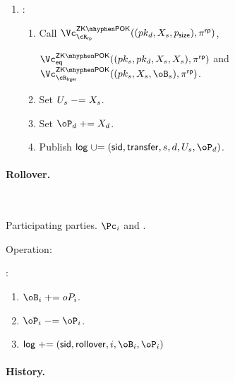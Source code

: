 \begin{protocol}
\begin{enumerate}
		
		\item  \Cc: 
		
		\begin{enumerate}
			\item  Call $\vZKPOK{\rRP}((pk_d,X_s,\psize),\pi^\RPs)$,
			
			 $\vZKPOK{\Eqs}((pk_s,pk_d,X_s,X_s),\pi^\RPs)$ and $\vZKPOK{\rLrg}((pk_s,X_s,\oB_s),\pi^\RPs)$.
			
		
		     \item  Set $U_s \mathrel{-}= X_s$. 
              
              \item  Set $\oP_d \pluseq X_d$. 
              
              		     
		     \item Publish  $\historylog \unioneq (\sid,\transfer,s,d,U_s,\oP_d)$.
		     
		\end{enumerate}
		
	\end{enumerate}
	
\end{protocol}



\paragraph{Rollover.}

\begin{protocol}~\label{prot:ConfidentialTransactions:Rollover}
	\item[Participating parties.] $\Pc_i$ and \Cc.
	
\item[Operation:] ~
	
	\Cc:
	
	\begin{enumerate}
	
	\item $\oB_i  \pluseq \\oP_i$.
	
	
	\item  $\oP_i \minuseq \oP_i$.
	
	\item  $\historylog \pluseq (\sid,\rollover,i,\oB_i,\oP_i)$
	
	
\end{enumerate}
	
\end{protocol}


\paragraph{History.}

